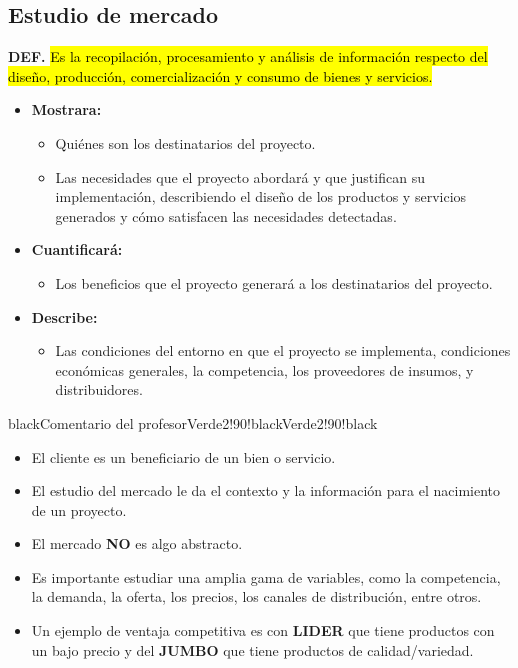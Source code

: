 \documentclass{templateNote}
\newcommand{\hlcolor}[2]{{\sethlcolor{#1}\hl{#2}}}
\begin{document}
\subsection{Estudio de mercado}\hypertarget{EM}{}
\textbf{DEF.} \hlcolor{Amarillo!50}{Es la recopilación, procesamiento y análisis de información respecto del diseño, producción, comercialización y consumo de bienes y servicios.}
\begin{itemize}
  \item \textbf{Mostrara:}
  \begin{itemize}
    \item Quiénes son los destinatarios del proyecto.
    \item Las necesidades que el proyecto abordará y que justifican su implementación, describiendo el diseño de los productos y servicios generados y cómo satisfacen las necesidades detectadas.
  \end{itemize}
  \item  \textbf{Cuantificará:}
  \begin{itemize}
    \item Los beneficios que el proyecto generará a los destinatarios del proyecto.
  \end{itemize}
  \item \textbf{Describe:}
  \begin{itemize}
    \item Las condiciones del entorno en que el proyecto se implementa, condiciones económicas generales, la competencia, los proveedores de insumos, y distribuidores.
  \end{itemize}
\end{itemize}
\begin{CuadroPersonalizado}{black}{Comentario del profesor}{Verde2!90!black}{Verde2!90!black}
  \begin{itemize}
    \item El cliente es un beneficiario de un bien o servicio.
    \item El estudio del mercado le da el contexto y la información para el nacimiento de un proyecto.
    \item El mercado \textbf{NO} es algo abstracto.
    \item Es importante estudiar una amplia gama de variables, como la competencia, la demanda, la oferta, los precios, los canales de distribución, entre otros.
    \item Un ejemplo de ventaja competitiva es con \textbf{LIDER} que tiene productos con un bajo precio y del \textbf{JUMBO} que tiene productos de calidad/variedad.
  \end{itemize}
\end{CuadroPersonalizado}
\end{document}

